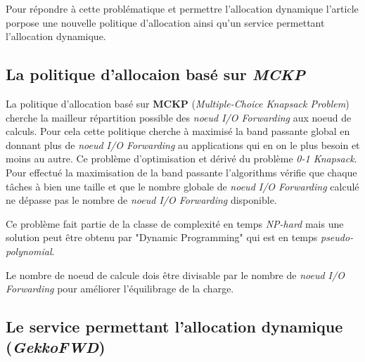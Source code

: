 \documentclass[10pt, a4paper]{article}
\begin{document}
Pour répondre à cette problématique et permettre l'allocation dynamique l'article porpose une nouvelle politique d'allocation ainsi qu'un service permettant l'allocation dynamique.

\subsection{La politique d'allocaion basé sur \emph{MCKP}}

La politique d'allocation basé sur \textbf{MCKP} (\emph{Multiple-Choice Knapsack Problem}) cherche la mailleur répartition possible des \emph{noeud I/O Forwarding} aux noeud de calculs.
Pour cela cette politique cherche à maximisé la band passante global en donnant plus de \emph{noeud I/O Forwarding} au applications qui en on le plus besoin et moins au autre. Ce problème d'optimisation et dérivé du problème \emph{0-1 Knapsack}.
Pour effectué la maximisation de la band passante l'algorithms vérifie que chaque tâches à bien une taille et que le nombre globale de \emph{noeud I/O Forwarding} calculé ne dépasse pas le nombre de \emph{noeud I/O Forwarding} disponible.

Ce problème fait partie de la classe de complexité en temps \emph{NP-hard} mais une solution peut être obtenu par "Dynamic Programming" qui est en temps \emph{pseudo-polynomial}.

Le nombre de noeud de calcule dois être divisable par le nombre de \emph{noeud I/O Forwarding} pour améliorer l'équilibrage de la charge.


\subsection{Le service permettant l'allocation dynamique (\emph{GekkoFWD})}
\end{document}
